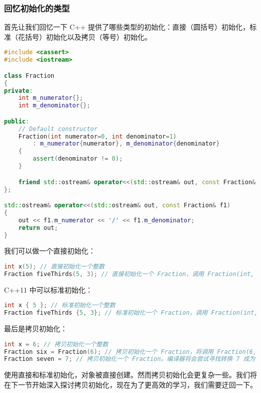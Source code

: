 \documentclass[../../LearnCpp.tex]{subfiles}
\begin{document}

\subsubsection*{回忆初始化的类型}

首先让我们回忆一下 C++ 提供了哪些类型的初始化：直接（圆括号）初始化，标准（花括号）初始化以及拷贝（等号）初始化。

\begin{lstlisting}[language=C++]
#include <cassert>
#include <iostream>

class Fraction
{
private:
    int m_numerator{};
    int m_denominator{};

public:
    // Default constructor
    Fraction(int numerator=0, int denominator=1)
        : m_numerator{numerator}, m_denominator{denominator}
    {
        assert(denominator != 0);
    }

    friend std::ostream& operator<<(std::ostream& out, const Fraction& f1);
};

std::ostream& operator<<(std::ostream& out, const Fraction& f1)
{
	out << f1.m_numerator << '/' << f1.m_denominator;
	return out;
}
\end{lstlisting}

我们可以做一个直接初始化：

\begin{lstlisting}[language=C++]
int x(5); // 直接初始化一个整数
Fraction fiveThirds(5, 3); // 直接初始化一个 Fraction，调用 Fraction(int, int) 构造函数
\end{lstlisting}

C++11 中可以标准初始化：

\begin{lstlisting}[language=C++]
int x { 5 }; // 标准初始化一个整数
Fraction fiveThirds {5, 3}; // 标准初始化一个 Fraction，调用 Fraction(int, int) 构造函数
\end{lstlisting}

最后是拷贝初始化：

\begin{lstlisting}[language=C++]
int x = 6; // 拷贝初始化一个整数
Fraction six = Fraction(6); // 拷贝初始化一个 Fraction，将调用 Fraction(6, 1)
Fraction seven = 7; // 拷贝初始化一个 Fraction。编译器将会尝试寻找转换 7 成为 Fraction 的方法，这会唤起 Fraction(7, 1) 构造函数。
\end{lstlisting}

使用直接和标准初始化，对象被直接创建。然而拷贝初始化会更复杂一些。我们将在下一节开始深入探讨拷贝初始化，现在为了更高效的学习，我们需要迂回一下。
\end{document}
